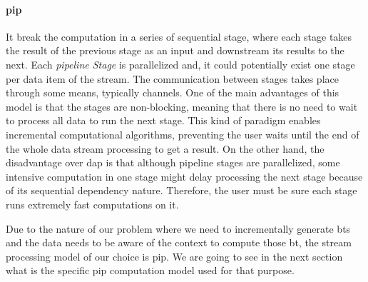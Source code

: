 \paragraph{\acrfull{pip}} It break the computation in a series of sequential stage, where each stage takes the result of the previous stage as an input and downstream its results to the next. 
Each \emph{pipeline Stage} is parallelized and, it could potentially exist one stage per data item of the stream. 
The communication between stages takes place through some means, typically channels. One of the main advantages of this model is that the stages are non-blocking, meaning that there is no need to wait to process all data to run the next stage. 
This kind of paradigm enables incremental computational algorithms, preventing the user waits until the end of the whole data stream processing to get a result. 
On the other hand, the disadvantage over \acrshort{dap} is that although pipeline stages are parallelized, 
some intensive computation in one stage might delay processing the next stage because of its sequential dependency nature. Therefore, the user must be sure each stage runs extremely fast computations on it.

Due to the nature of our problem where we need to incrementally generate \acrlong{bt}s and the data needs to be aware of the context to compute those \acrshort{bt}, the stream processing model of our choice is \acrshort{pip}.
We are going to see in the next section what is the specific \acrshort{pip} computation model used for that purpose.

